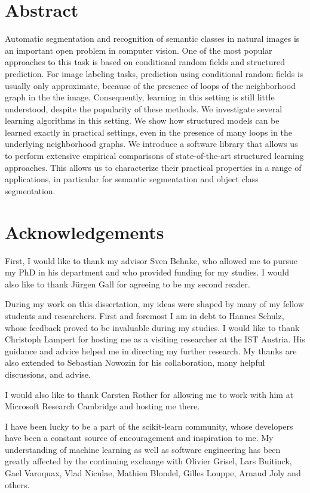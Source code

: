 \documentclass[12pt,toc=bibnumbered, a4paper,twoside,DIV=calc]{scrbook}
\begin{document}
\chapter*{Abstract}
Automatic segmentation and recognition of semantic classes in natural images is an important open problem in computer vision.
One of the most popular approaches to this task is based on conditional random fields and structured prediction.
For image labeling tasks, prediction using conditional random fields is usually only approximate, because of the presence
of loops of the neighborhood graph in the the image. Consequently, learning in
this setting is still little understood, despite the popularity of these
methods.
%
We investigate several learning algorithms in this setting. We show
how structured models can be learned exactly in practical settings, even in the
presence of many loops in the underlying neighborhood graphs.  We introduce a
software library that allows us to perform extensive empirical comparisons of
state-of-the-art structured learning approaches. This allows us to characterize
their practical properties in a range of applications, in particular for semantic segmentation
and object class segmentation.


\chapter*{Acknowledgements}
First, I would like to thank my advisor Sven Behnke, who allowed me
to pursue my PhD in his department and who provided funding for my studies.
I would also like to thank J\"urgen Gall for agreeing to be my second reader.

During my work on this dissertation, my ideas were shaped by many of my fellow
students and researchers. First and foremost I am in debt to Hannes Schulz,
whose feedback proved to be invaluable during my studies.
I would like to thank Christoph Lampert for hosting me as a visiting researcher
at the IST Austria. His guidance and advice helped me in directing my further
research. My thanks are also extended to Sebastian Nowozin for his collaboration,
many helpful discussions, and advise.

I would also like to thank Carsten Rother for allowing me to work with him
at Microsoft Research Cambridge and hosting me there.

I have been lucky to be a part of the scikit-learn community, whose developers
have been a constant source of encouragement and inspiration to me. My
understanding of machine learning as well as software engineering has been
greatly affected by the continuing exchange with Olivier Grisel, Lars Buitinck,
Gael Varoquax, Vlad Niculae, Mathieu Blondel, Gilles Louppe, Arnaud Joly and
others.
\end{document}
